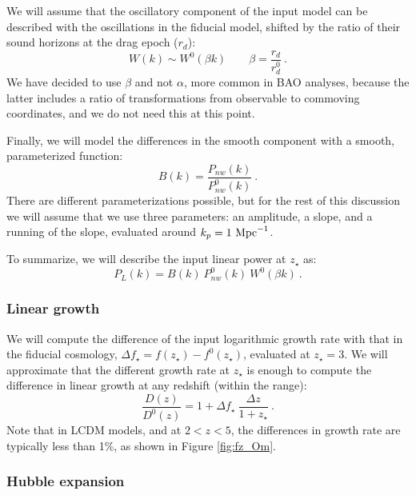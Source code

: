 We will assume that the oscillatory component of the input model can be 
described with the oscillations in the fiducial model, shifted by the ratio 
of their sound horizons at the drag epoch ($r_d$):
\begin{equation}
 W(k) \sim W^0(\beta k)  
\qquad  
 \beta = \frac{r_d}{r^0_d} ~.
\end{equation}
We have decided to use $\beta$ and not $\alpha$, more common in BAO analyses,
because the latter includes a ratio of transformations from observable to 
commoving coordinates, and we do not need this at this point. 

Finally, we will model the differences in the smooth component with a smooth,
parameterized function:
\begin{equation}
 B(k) = \frac{P_{nw}(k)}{P_{nw}^0(k)} ~.
\end{equation}
There are different parameterizations possible, but for the rest of this 
discussion we will assume that we use three parameters: an amplitude, 
a slope, and a running of the slope, evaluated around $k_p = 1 \ \text{Mpc}^{-1}$. 

To summarize, we will describe the input linear power at $z_\star$ as:
\begin{equation} \label{eq:Pk_param}
 P_L(k) = B(k) ~ P_{nw}^0(k) ~ W^0(\beta k) ~.
\end{equation}

\subsubsection{Linear growth}

We will compute the difference of the input logarithmic growth rate with that 
in the fiducial cosmology, $\Delta f_\star = f(z_\star) - f^0(z_\star)$, 
evaluated at $z_\star=3$. 
We will approximate that the different growth rate at $z_\star$ is enough 
to compute the difference in linear growth at any redshift (within the range):
\begin{equation}\label{eq:growth}
 \frac{D(z)}{D^0(z)} = 1 + \Delta f_\star ~ \frac{\Delta z}{1 + z_\star} ~.
\end{equation} 
Note that in LCDM models, and at $2 < z < 5$, the differences in growth rate 
are typically less than 1\%, as shown in Figure \ref{fig:fz_Om}.

\subsubsection{Hubble expansion}

